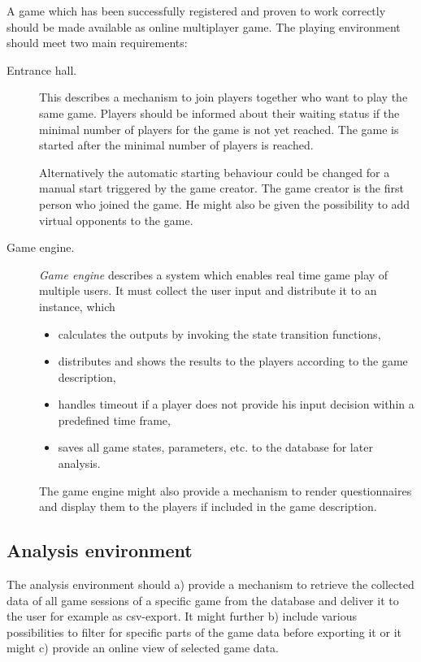 A game which has been successfully registered and proven to work correctly should be made available as online multiplayer game. The playing environment should meet two main requirements:

\begin{description}
\item[Entrance hall.] This describes a mechanism to join players together who want to play the same game. Players should be informed about their waiting status if the minimal number of players for the game is not yet reached. The game is started after the minimal number of players is reached.

Alternatively the automatic starting behaviour could be changed for a manual start triggered by the game creator. The game creator is the first person who joined the game. He might also be given the possibility to add virtual opponents to the game.
\item[Game engine.] \textit{Game engine} describes a system which enables real time game play of multiple users. It must collect the user input and distribute it to an instance, which
\begin{itemize}
\item calculates the outputs by invoking the state transition functions,
\item distributes and shows the results to the players according to the game description,
\item handles timeout if a player does not provide his input decision within a predefined time frame,
\item saves all game states, parameters, etc. to the database for later analysis.
\end{itemize}
The game engine might also provide a mechanism to render questionnaires and display them to the players if included in the game description.
\end{description}

\subsection{Analysis environment}
\label{subsec:req:analysis}

The analysis environment should a) provide a mechanism to retrieve the collected data of all game sessions of a specific game from the database and deliver it to the user for example as csv-export. It might further b) include various possibilities to filter for specific parts of the game data before exporting it or it might c) provide an online view of selected game data.

